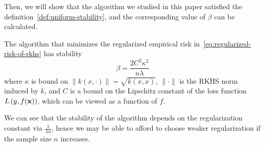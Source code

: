 Then, we will show that the algorithm we studied in this paper satisfied the definition~\ref{def:uniform-stability}, and the corresponding value of \(\beta\) can be calculated.

\begin{theorem}\label{thm:algorithmic-stability-of-risk-minimizers}
	The algorithm that minimizes the regularized empirical risk in~\eqref{eq:regularized-risk-of-rkhs} has stability
	\begin{equation}
		\beta=\frac{2C^{2}\kappa^{2}}{n\lambda}
	\end{equation}
	where \(\kappa\) is bound on \(\|k(x,\cdot)\|=\sqrt{k(x,x)}\), \(\|\cdot\|\) is the RKHS norm induced by \(k\), and \(C\) is a bound on the Lipschitz constant of the loss function \(L\left(y,f(\mathbf{x})\right)\), which can be viewed as a function of \(f\).
\end{theorem}

\begin{remark}
	We can see that the stability of the algorithm depends on the regularization constant via \(\frac{1}{\lambda n}\), hence we may be able to afford to choose weaker regularization if the sample size \(n\) increases.
\end{remark}

